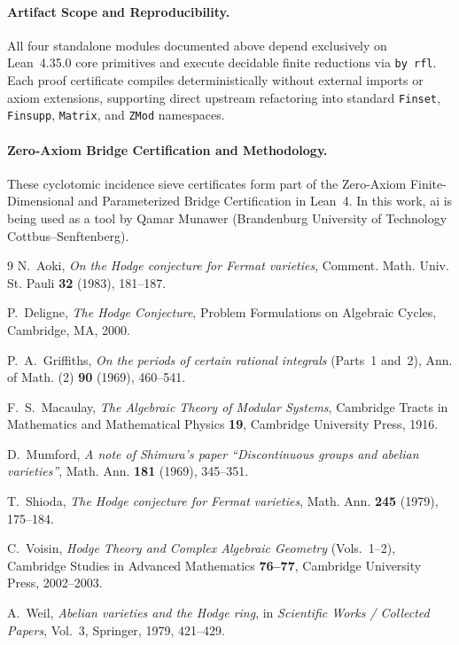 \documentclass[11pt,a4paper]{article}
\begin{document}
\paragraph*{Artifact Scope and Reproducibility.}
All four standalone modules documented above depend exclusively on Lean~4.35.0 core primitives and execute decidable finite reductions via \texttt{by rfl}. Each proof certificate compiles deterministically without external imports or axiom extensions, supporting direct upstream refactoring into standard \texttt{Finset}, \texttt{Finsupp}, \texttt{Matrix}, and \texttt{ZMod} namespaces.

\paragraph*{Zero-Axiom Bridge Certification and Methodology.}
These cyclotomic incidence sieve certificates form part of the Zero-Axiom Finite-Dimensional and Parameterized Bridge Certification in Lean~4. In this work, ai is being used as a tool by Qamar Munawer (Brandenburg University of Technology Cottbus--Senftenberg).

\begin{thebibliography}{9}
N.~Aoki, \emph{On the Hodge conjecture for Fermat varieties}, Comment. Math. Univ. St. Pauli \textbf{32} (1983), 181--187.

P.~Deligne, \emph{The Hodge Conjecture}, Problem Formulations on Algebraic Cycles, Cambridge, MA, 2000.

P.~A.~Griffiths, \emph{On the periods of certain rational integrals} (Parts~1 and~2), Ann. of Math. (2) \textbf{90} (1969), 460--541.

F.~S.~Macaulay, \emph{The Algebraic Theory of Modular Systems}, Cambridge Tracts in Mathematics and Mathematical Physics \textbf{19}, Cambridge University Press, 1916.

D.~Mumford, \emph{A note of Shimura's paper ``Discontinuous groups and abelian varieties''}, Math. Ann. \textbf{181} (1969), 345--351.

T.~Shioda, \emph{The Hodge conjecture for Fermat varieties}, Math. Ann. \textbf{245} (1979), 175--184.

C.~Voisin, \emph{Hodge Theory and Complex Algebraic Geometry} (Vols.~1--2), Cambridge Studies in Advanced Mathematics \textbf{76--77}, Cambridge University Press, 2002--2003.

A.~Weil, \emph{Abelian varieties and the Hodge ring}, in \emph{Scientific Works / Collected Papers}, Vol.~3, Springer, 1979, 421--429.
\end{thebibliography}
\end{document}

